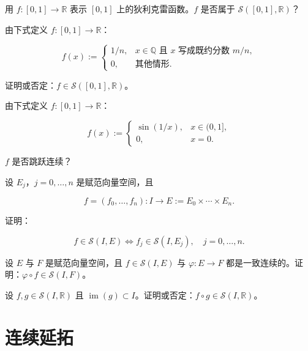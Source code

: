 \begin{exercises}
用 $ f : [0, 1] \to \mathbb{R} $ 表示 $ [0, 1] $ 上的狄利克雷函数。$ f $ 是否属于 $ \mathcal{S}([0, 1], \mathbb{R}) $？

\item

由下式定义 $ f : [0, 1] \to \mathbb{R} $：

\begin{equation*}
f(x) := \begin{cases} 1/n, & x \in \mathbb{Q} \text{ 且 } x \text{ 写成既约分数 } m/n, \\ 0, & \text{其他情形}. \end{cases}
\end{equation*}

证明或否定：$ f \in \mathcal{S}([0, 1], \mathbb{R}) $。

\item

由下式定义 $ f : [0, 1] \to \mathbb{R} $：

\begin{equation*}
f(x) := \begin{cases} \sin(1/x), & x \in (0, 1], \\ 0, & x = 0. \end{cases}
\end{equation*}

$ f $ 是否跳跃连续？

\item

设 $ E_j $，$ j = 0, \ldots, n $ 是赋范向量空间，且

\[
f = (f_0, \ldots, f_n) : I \to E := E_0 \times \cdots \times E_n.
\]

证明：

\[
f \in \mathcal{S}(I, E) \Longleftrightarrow f_j \in \mathcal{S}(I, E_j), \quad j = 0, \ldots, n.
\]
\item

设 $ E $ 与 $ F $ 是赋范向量空间，且 $ f \in \mathcal{S}(I, E) $ 与 $ \varphi : E \to F $ 都是一致连续的。证明：$ \varphi \circ f \in \mathcal{S}(I, F) $。

\item

设 $ f, g \in \mathcal{S}(I, \mathbb{R}) $ 且 $ \operatorname{im}(g) \subset I $。证明或否定：$ f \circ g \in \mathcal{S}(I, \mathbb{R}) $。

\end{exercises}

\section{连续延拓}

